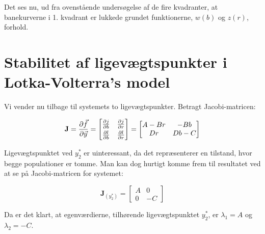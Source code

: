Det ses nu, ud fra ovenstående undersøgelse af de fire kvadranter, at banekurverne i 1. kvadrant er lukkede grundet funktionerne, $w(b)$ og $z(r)$, forhold.

\section{Stabilitet af ligevægtspunkter i Lotka-Volterra's model}
Vi vender nu tilbage til systemets to ligevægtspunkter. Betragt Jacobi-matricen: 

$$\textbf{J}=\frac{\partial\vec{f}}{\partial \vec{y}}=
    \begin{bmatrix}
    \frac{\partial j}{\partial b} & \frac{\partial j}{\partial r}\vspace{1mm}\\
    \frac{\partial l}{\partial b} & \frac{\partial l}{\partial r}
    \end{bmatrix}
    =
    \begin{bmatrix}
    A-Br & -Bb\\
    Dr & Db-C
    \end{bmatrix}$$


Ligevægtspunktet ved $y_2^*$ er uinteressant, da det repræsenterer en tilstand, hvor begge populationer er tomme. Man kan dog hurtigt komme frem til resultatet ved at se på Jacobi-matricen for systemet:
 
$$
\textbf{J}_{\left(y_2^* \right)} = \begin{bmatrix}
A & 0\\
0 & -C
\end{bmatrix}
$$

Da er det klart, at egenværdierne, tilhørende ligevægtspunktet $y_2^*$, er $\lambda_1 = A$ og $\lambda_2 = -C$. %

